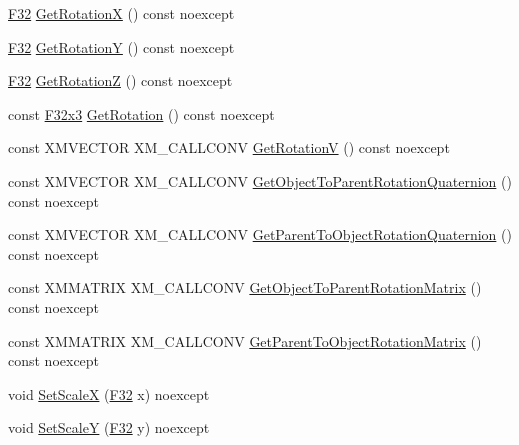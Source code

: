 \begin{DoxyCompactItemize}
\item 
\mbox{\hyperlink{namespacemage_aa97e833b45f06d60a0a9c4fc22ae02c0}{F32}} \mbox{\hyperlink{classmage_1_1_local_transform_af60f86fbaa2dc4562d67100215a63a61}{Get\+RotationX}} () const noexcept
\item 
\mbox{\hyperlink{namespacemage_aa97e833b45f06d60a0a9c4fc22ae02c0}{F32}} \mbox{\hyperlink{classmage_1_1_local_transform_a7d6b4eba97d85e80dacb6dc663c17e9c}{Get\+RotationY}} () const noexcept
\item 
\mbox{\hyperlink{namespacemage_aa97e833b45f06d60a0a9c4fc22ae02c0}{F32}} \mbox{\hyperlink{classmage_1_1_local_transform_ae56bae1d47047892c6588a1fe3f115ad}{Get\+RotationZ}} () const noexcept
\item 
const \mbox{\hyperlink{namespacemage_a1e3c7a882af461f161caa1cbddaf1fa2}{F32x3}} \mbox{\hyperlink{classmage_1_1_local_transform_a06ddc0ea860a58ed7d47abc115ea70e3}{Get\+Rotation}} () const noexcept
\item 
const X\+M\+V\+E\+C\+T\+OR X\+M\+\_\+\+C\+A\+L\+L\+C\+O\+NV \mbox{\hyperlink{classmage_1_1_local_transform_a489f350ed2e1e7eea1d168502cd03e88}{Get\+RotationV}} () const noexcept
\item 
const X\+M\+V\+E\+C\+T\+OR X\+M\+\_\+\+C\+A\+L\+L\+C\+O\+NV \mbox{\hyperlink{classmage_1_1_local_transform_a5d9cb07de3b11b31665f2bb35580febc}{Get\+Object\+To\+Parent\+Rotation\+Quaternion}} () const noexcept
\item 
const X\+M\+V\+E\+C\+T\+OR X\+M\+\_\+\+C\+A\+L\+L\+C\+O\+NV \mbox{\hyperlink{classmage_1_1_local_transform_a66e6d3320e87461203f91599e23ee6c1}{Get\+Parent\+To\+Object\+Rotation\+Quaternion}} () const noexcept
\item 
const X\+M\+M\+A\+T\+R\+IX X\+M\+\_\+\+C\+A\+L\+L\+C\+O\+NV \mbox{\hyperlink{classmage_1_1_local_transform_a43be02da78f59f2e6ab5d5719816498b}{Get\+Object\+To\+Parent\+Rotation\+Matrix}} () const noexcept
\item 
const X\+M\+M\+A\+T\+R\+IX X\+M\+\_\+\+C\+A\+L\+L\+C\+O\+NV \mbox{\hyperlink{classmage_1_1_local_transform_a5054e57409d6852adcde6283ca8a5c49}{Get\+Parent\+To\+Object\+Rotation\+Matrix}} () const noexcept
\item 
void \mbox{\hyperlink{classmage_1_1_local_transform_afaab2f329bb986de112e76ba8407b84e}{Set\+ScaleX}} (\mbox{\hyperlink{namespacemage_aa97e833b45f06d60a0a9c4fc22ae02c0}{F32}} x) noexcept
\item 
void \mbox{\hyperlink{classmage_1_1_local_transform_a17297480169c047f0a08c2022b69fc42}{Set\+ScaleY}} (\mbox{\hyperlink{namespacemage_aa97e833b45f06d60a0a9c4fc22ae02c0}{F32}} y) noexcept

\end{DoxyCompactItemize}
